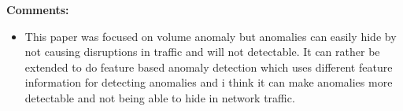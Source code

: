 \documentclass[a4paper,12pt, twoside]{article}
\begin{document}
\textbf{Comments:}
\begin{itemize}
	\item This paper was focused on volume anomaly but anomalies can easily hide by not causing disruptions in traffic and will not detectable. It can rather be extended to do feature based anomaly detection which uses different feature information for detecting anomalies and i think it can make anomalies more detectable and not being able to hide in network traffic.    
\end{itemize}
\end{document}
